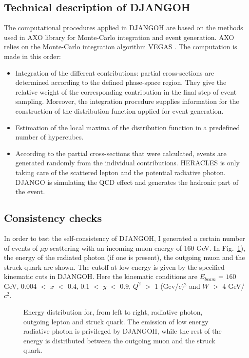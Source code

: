 \subsection{Technical description of DJANGOH}

The computational procedures applied in DJANGOH are based on the methods used in AXO \cite{AXO} library for Monte-Carlo integration and event generation. AXO relies on the Monte-Carlo integration algorithm VEGAS \cite{VEGAS}. The computation is made in this order:

\begin{itemize}
\item Integration of the different contributions: partial cross-sections are determined according to the defined phase-space region. They give the relative weight of the corresponding contribution in the final step of event sampling. Moreover, the integration procedure supplies information for the construction of the distribution function applied for event generation.
\item Estimation of the local maxima of the distribution function in a predefined number of hypercubes.
\item According to the partial cross-sections that were calculated, events are generated randomly from the individual contributions. HERACLES is only taking care of the scattered lepton and the potential radiative photon. DJANGO is simulating the QCD effect and generates the hadronic part of the event.
\end{itemize}

\subsection{Consistency checks}

In order to test the self-consistency of DJANGOH, I generated a certain number of events of $\mu p$ scattering with an incoming muon energy of 160 GeV. In Fig.~\ref{fig:edist}), the energy of the radiated photon (if one is present), the outgoing muon and the struck quark are shown. The cutoff at low energy is given by the specified kinematic cuts in DJANGOH. Here the kinematic conditions are $E_{beam}$ = $160$ GeV, $0.004$ $<$ $x$ $<$ $0.4$, $0.1$ $<$ $y$ $<$ $0.9$, $Q^2$ $>$ $1$ (Gev/$c$)$^2$ and $W$ $>$ $4$ GeV/$c^2$.

\begin{figure}[htb]
\centerline{}
\caption{Energy distribution for, from left to right, radiative photon, outgoing lepton and struck quark. The emission of low energy radiative photon is privileged by DJANGOH, while the rest of the energy is distributed between the outgoing muon and the struck quark.} \label{fig:edist}
\end{figure}

